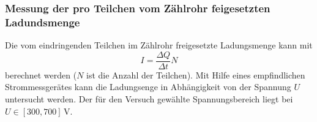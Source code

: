 \subsubsection{Messung der pro Teilchen vom Zählrohr feigesetzten Ladundsmenge} %
Die vom eindringenden Teilchen im Zählrohr freigesetzte Ladungsmenge kann mit
\begin{equation}
  \label{eq:lafung_pro_teilchen}
  I=\frac{\Delta Q}{\Delta t} N
\end{equation}
berechnet werden ($N$ ist die Anzahl der Teilchen).
Mit Hilfe eines empfindlichen Strommessgerätes
kann die Ladungsenge in Abhängigkeit von der Spannung $U$ untersucht werden.
Der für den Versuch gewählte Spannungsbereich liegt bei $U\in\left[300, 700\right] \, \si{\volt}$.
